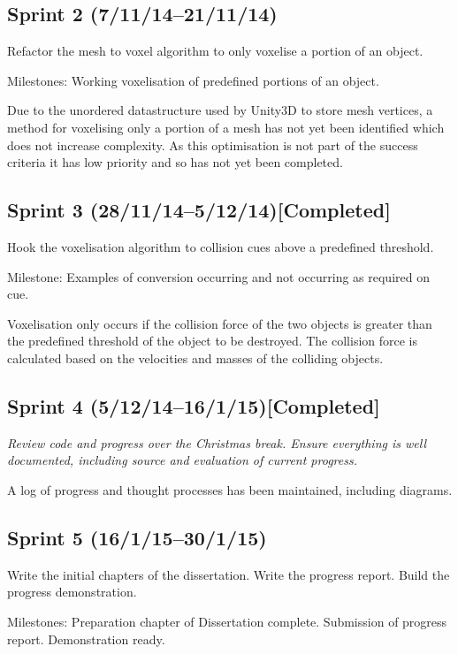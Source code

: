 \documentclass[a4 paper,12pt]{article}
\begin{document}
\subsection*{Sprint 2 (7/11/14--21/11/14)}

{\it{Refactor the mesh to voxel algorithm to only voxelise a portion of an object.

Milestones: Working voxelisation of predefined portions of an object.}}

Due to the unordered datastructure used by Unity3D to store mesh vertices, a method for voxelising only a portion of a mesh has not yet been identified which does not increase complexity. As this optimisation is not part of the success criteria it has low priority and so has not yet been completed.


\subsection*{Sprint 3 (28/11/14--5/12/14)[Completed]}

{\it{Hook the voxelisation algorithm to collision cues above a predefined threshold.

Milestone: Examples of conversion occurring and not occurring as required on cue.}}

Voxelisation only occurs if the collision force of the two objects is greater than the predefined threshold of the object to be destroyed. The collision force is calculated based on the velocities and masses of the colliding objects.


\subsection*{Sprint 4 (5/12/14--16/1/15)[Completed]}

{\it{Review code and progress over the Christmas break. Ensure everything is well documented, including source and evaluation of current progress.}}

A log of progress and thought processes has been maintained, including diagrams.


\subsection*{Sprint 5 (16/1/15--30/1/15)}

{\it{Write the initial chapters of the dissertation. Write the progress report. Build the progress demonstration.

Milestones: Preparation chapter of Dissertation complete. Submission of progress report. Demonstration ready.}}
\end{document}
